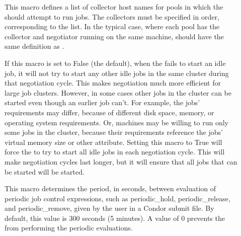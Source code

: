 \begin{description}
\item[] \label{param:FLockCollectorHosts}
  This macro defines a list of collector host names for pools in which
  the  should attempt to run jobs.  The
  collectors must be specified in order, corresponding to the
   list.  In the typical case, where each pool
  has the collector and negotiator running on the same machine,
   should have the same definition as
  .


\item[]
  \label{param:NegotiateAllJobsInCluster}
  If this macro is set to False (the default), when the  fails
  to start an idle job, it will not try to start any other
  idle jobs in the same cluster during that negotiation cycle.  This
  makes negotiation much more efficient for large job clusters.
  However, in some cases other jobs in the cluster can be started even
  though an earlier job can't.  For example, the jobs' requirements
  may differ, because of different disk space, memory, or
  operating system requirements.  Or, machines may be willing to run
  only some jobs in the cluster, because their requirements reference
  the jobs' virtual memory size or other attribute.  Setting this
  macro to True will force the  to try to start all idle jobs in
  each negotiation cycle.  This will make negotiation cycles last
  longer, but it will ensure that all jobs that can be started will be
  started.

\item[]
  \label{param:PeriodicExprInterval} This macro determines the period,
  in seconds, between evaluation of periodic job control expressions,
  such as periodic\_hold, periodic\_release, and periodic\_remove,
  given by the user in a Condor submit file. By default, this value is
  300 seconds (5 minutes).  A value of 0 prevents the  from
  performing the periodic evaluations.


\end{description}

